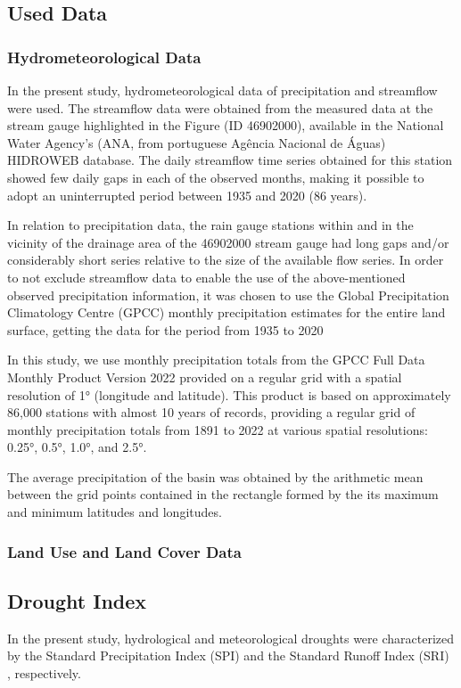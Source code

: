     \subsection{Used Data}      
        \subsubsection{Hydrometeorological Data}
            In the present study, hydrometeorological data of precipitation and streamflow were used. The streamflow data were obtained from the measured data at the stream gauge highlighted in the Figure (ID 46902000), available in the National Water Agency's (ANA, from portuguese Agência Nacional de Águas) HIDROWEB database. The daily streamflow time series obtained for this station showed few daily gaps in each of the observed months, making it possible to adopt an uninterrupted period between 1935 and 2020 (86 years).
    
            In relation to precipitation data, the rain gauge stations within and in the vicinity of the drainage area of the 46902000 stream gauge had long gaps and/or considerably short series relative to the size of the available flow series. In order to not exclude streamflow data to enable the use of the above-mentioned observed precipitation information, it was chosen to use the Global Precipitation Climatology Centre (GPCC) monthly precipitation estimates for the entire land surface, getting the data for the period from 1935 to 2020
    
            In this study, we use monthly precipitation totals from the GPCC Full Data Monthly Product Version 2022 provided on a regular grid with a spatial resolution of 1° (longitude and latitude). This product is based on approximately 86,000 stations with almost 10 years of records, providing a regular grid of monthly precipitation totals from 1891 to 2022 at various spatial resolutions: 0.25°, 0.5°, 1.0°, and 2.5°\citep{GPCC:2022}. 
    
            The average precipitation of the basin was obtained by the arithmetic mean between the grid points contained in the rectangle formed by the its maximum and minimum latitudes and longitudes.
        \subsubsection{Land Use and Land Cover Data}
    \blindtext
    
    \subsection{Drought Index}
        In the present study, hydrological and meteorological droughts were characterized by the Standard Precipitation Index (SPI) \citep{mckee1993} and the Standard Runoff Index (SRI) \citep{Shukla2008}, respectively.

